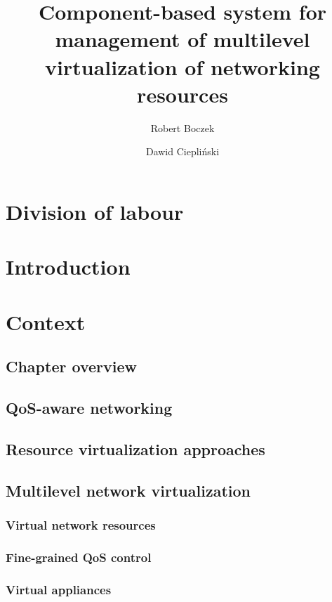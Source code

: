 \documentclass[11pt]{book}
\title{Component-based system for management of multilevel virtualization of networking resources}
\author{Robert Boczek \and Dawid Ciepliński}
\begin{document}
  \maketitle
    
  \tableofcontents

  \chapter{Division of labour} %
	

  \chapter{Introduction}



  \chapter{Context}  %

    \section*{Chapter overview}


    \section{QoS-aware networking}


    \section{Resource virtualization approaches}


    \section{Multilevel network virtualization}

      \subsection{Virtual network resources}

      \subsection{Fine-grained QoS control}

      \subsection{Virtual appliances}
\end{document}
